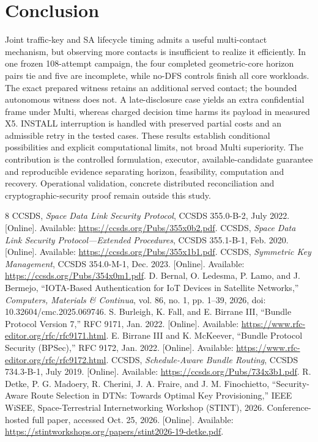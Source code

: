 \documentclass[conference]{IEEEtran}
\begin{document}
\section{Conclusion}
Joint traffic-key and SA lifecycle timing admits a useful multi-contact mechanism, but observing more contacts is insufficient to realize it efficiently. In one frozen 108-attempt campaign, the four completed geometric-core horizon pairs tie and five are incomplete, while no-DFS controls finish all core workloads. The exact prepared witness retains an additional served contact; the bounded autonomous witness does not. A late-disclosure case yields an extra confidential frame under Multi, whereas charged decision time harms its payload in measured X5. INSTALL interruption is handled with preserved partial costs and an admissible retry in the tested cases. These results establish conditional possibilities and explicit computational limits, not broad Multi superiority. The contribution is the controlled formulation, executor, available-candidate guarantee and reproducible evidence separating horizon, feasibility, computation and recovery. Operational validation, concrete distributed reconciliation and cryptographic-security proof remain outside this study.

\begin{thebibliography}{8}
 CCSDS, \emph{Space Data Link Security Protocol}, CCSDS 355.0-B-2, July 2022. [Online]. Available: \url{https://ccsds.org/Pubs/355x0b2.pdf}.
 CCSDS, \emph{Space Data Link Security Protocol---Extended Procedures}, CCSDS 355.1-B-1, Feb. 2020. [Online]. Available: \url{https://ccsds.org/Pubs/355x1b1.pdf}.
 CCSDS, \emph{Symmetric Key Management}, CCSDS 354.0-M-1, Dec. 2023. [Online]. Available: \url{https://ccsds.org/Pubs/354x0m1.pdf}.
 D. Bernal, O. Ledesma, P. Lamo, and J. Bermejo, ``IOTA-Based Authentication for IoT Devices in Satellite Networks,'' \emph{Computers, Materials \& Continua}, vol. 86, no. 1, pp. 1--39, 2026, doi: 10.32604/cmc.2025.069746.
 S. Burleigh, K. Fall, and E. Birrane III, ``Bundle Protocol Version 7,'' RFC 9171, Jan. 2022. [Online]. Available: \url{https://www.rfc-editor.org/rfc/rfc9171.html}.
 E. Birrane III and K. McKeever, ``Bundle Protocol Security (BPSec),'' RFC 9172, Jan. 2022. [Online]. Available: \url{https://www.rfc-editor.org/rfc/rfc9172.html}.
 CCSDS, \emph{Schedule-Aware Bundle Routing}, CCSDS 734.3-B-1, July 2019. [Online]. Available: \url{https://ccsds.org/Pubs/734x3b1.pdf}.
 R. Detke, P. G. Madoery, R. Cherini, J. A. Fraire, and J. M. Finochietto, ``Security-Aware Route Selection in DTNs: Towards Optimal Key Provisioning,'' IEEE WiSEE, Space-Terrestrial Internetworking Workshop (STINT), 2026. Conference-hosted full paper, accessed Oct. 25, 2026. [Online]. Available: \url{https://stintworkshops.org/papers/stint2026-19-detke.pdf}.
\end{thebibliography}
\end{document}
